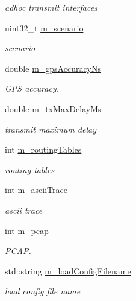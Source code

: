 \begin{DoxyCompactItemize}
\begin{DoxyCompactList}\small\item\em adhoc transmit interfaces \end{DoxyCompactList}\item 
uint32\+\_\+t \hyperlink{classVanetRoutingExperiment_aeabf077a592421116de2b2df582471c8}{m\+\_\+scenario}
\begin{DoxyCompactList}\small\item\em scenario \end{DoxyCompactList}\item 
double \hyperlink{classVanetRoutingExperiment_a93d058dcc4a02c67de923ab6a1d8bf85}{m\+\_\+gps\+Accuracy\+Ns}
\begin{DoxyCompactList}\small\item\em G\+PS accuracy. \end{DoxyCompactList}\item 
double \hyperlink{classVanetRoutingExperiment_a9190dcd0fea18c790a67ee058416c8dd}{m\+\_\+tx\+Max\+Delay\+Ms}
\begin{DoxyCompactList}\small\item\em transmit maximum delay \end{DoxyCompactList}\item 
int \hyperlink{classVanetRoutingExperiment_ade07fe0bee115e9dbcd4765ba8754522}{m\+\_\+routing\+Tables}
\begin{DoxyCompactList}\small\item\em routing tables \end{DoxyCompactList}\item 
int \hyperlink{classVanetRoutingExperiment_a2de6513e66df96777e2a8fbd9b7c615a}{m\+\_\+ascii\+Trace}
\begin{DoxyCompactList}\small\item\em ascii trace \end{DoxyCompactList}\item 
int \hyperlink{classVanetRoutingExperiment_ac7fb62cd5e00be235c70ac0848646ba4}{m\+\_\+pcap}
\begin{DoxyCompactList}\small\item\em P\+C\+AP. \end{DoxyCompactList}\item 
std\+::string \hyperlink{classVanetRoutingExperiment_a56e00537f102a206011e18df57caf6c0}{m\+\_\+load\+Config\+Filename}
\begin{DoxyCompactList}\small\item\em load config file name \end{DoxyCompactList}\item 

\end{DoxyCompactItemize}
